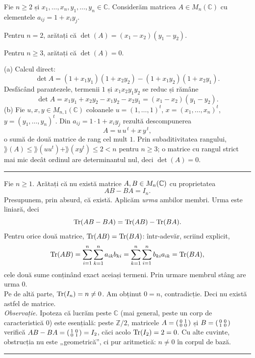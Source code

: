 Fie $n\ge2$ și $x_1,\dots,x_n,y_1,\dots,y_n\in\mathbb{C}$. Considerăm matricea $A\in M_n(\mathbb{C})$ cu elementele $a_{ij}=1+x_iy_j$.
\begin{parti}
  \item Pentru $n=2$, arătați că $\det(A)=(x_1-x_2)(y_1-y_2)$.
  \item Pentru $n\ge3$, arătați că $\det(A)=0$.
\end{parti}
\sol (a) Calcul direct:
\[ \det A=(1+x_1y_1)(1+x_2y_2)-(1+x_1y_2)(1+x_2y_1). \]
Desfăcând parantezele, termenii $1$ și $x_1x_2y_1y_2$ se reduc și rămâne
\[ \det A=x_1y_1+x_2y_2-x_1y_2-x_2y_1=(x_1-x_2)(y_1-y_2). \]
(b) Fie $u,x,y\in M_{n,1}(\mathbb{C})$ coloanele $u=(1,\dots,1)^t$, $x=(x_1,\dots,x_n)^t$, $y=(y_1,\dots,y_n)^t$. Din $a_{ij}=1\cdot1+x_iy_j$ rezultă descompunerea
\[ A=u\,u^{\,t}+x\,y^{\,t}, \]
o sumă de două matrice de rang cel mult $1$. Prin subaditivitatea rangului, $\rang(A)\le\rang(uu^t)+\rang(xy^t)\le2<n$ pentru $n\ge3$; o matrice cu rangul strict mai mic decât ordinul are determinantul nul, deci $\det(A)=0$.
\vspace{1mm}\hrule

Fie $n\ge1$. Arătați că nu există matrice $A,B\in M_n(\mathbb{C})$ cu proprietatea
\[ AB-BA=I_n . \]
\sol Presupunem, prin absurd, că există. Aplicăm \emph{urma} ambilor membri. Urma este liniară, deci
\[ \operatorname{Tr}(AB-BA)=\operatorname{Tr}(AB)-\operatorname{Tr}(BA). \]
Pentru orice două matrice, $\operatorname{Tr}(AB)=\operatorname{Tr}(BA)$: într-adevăr, scriind explicit,
\[ \operatorname{Tr}(AB)=\sum_{i=1}^n\sum_{k=1}^n a_{ik}b_{ki}=\sum_{k=1}^n\sum_{i=1}^n b_{ki}a_{ik}=\operatorname{Tr}(BA), \]
cele două sume conținând exact aceiași termeni. Prin urmare membrul stâng are urma $0$.\\[2pt]
Pe de altă parte, $\operatorname{Tr}(I_n)=n\neq0$. Am obținut $0=n$, contradicție. Deci nu există astfel de matrice.\\[2pt]
\emph{Observație.} Ipoteza că lucrăm peste $\mathbb{C}$ (mai general, peste un corp de caracteristică $0$) este esențială: peste $\mathbb{Z}/2$, matricele $A=\begin{psmallmatrix}0&1\\0&0\end{psmallmatrix}$ și $B=\begin{psmallmatrix}0&0\\1&0\end{psmallmatrix}$ verifică $AB-BA=\begin{psmallmatrix}1&0\\0&1\end{psmallmatrix}=I_2$, căci acolo $\operatorname{Tr}(I_2)=2=0$. Cu alte cuvinte, obstrucția nu este „geometrică'', ci pur aritmetică: $n\neq0$ în corpul de bază.
\vspace{1mm}\hrule

